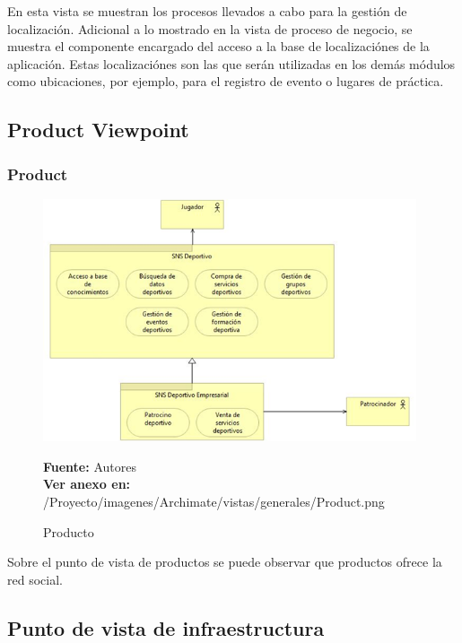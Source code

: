 En esta vista se muestran los procesos llevados a cabo para la gestión de localización. Adicional a lo mostrado en la vista de proceso de negocio, se muestra el componente encargado del acceso a la base de localizaciónes de la aplicación. Estas localizaciónes son las que serán utilizadas en los demás módulos como ubicaciones, por ejemplo, para el registro de evento o lugares de práctica.

\subsection{Product Viewpoint}

\subsubsection{Product}

\begin{figure}[!htb]
  \begin{center}
    \includegraphics[width=11cm]{./imagenes/Archimate/vistas/generales/Product.png}
    \caption{Producto}
    \label{fig:Product}
    \textbf{Fuente:}  Autores \\
    \textbf{Ver anexo en:} /Proyecto/imagenes/Archimate/vistas/generales/Product.png
  \end{center}
\end{figure}

Sobre el punto de vista de productos se puede observar que productos ofrece la red social.

\subsection{Punto de vista de infraestructura}


